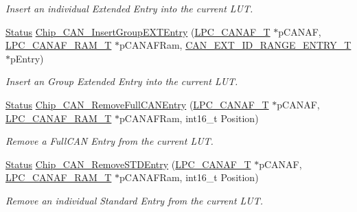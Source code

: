 \begin{DoxyCompactItemize}
\begin{DoxyCompactList}\small\item\em Insert an individual Extended Entry into the current L\-U\-T. \end{DoxyCompactList}\item 
\hyperlink{group__LPC__Types__Public__Types_ga67a0db04d321a74b7e7fcfd3f1a3f70b}{Status} \hyperlink{group__CAN__17XX__40XX_ga6bb7c9685df871a1d6dae14908c70397}{Chip\-\_\-\-C\-A\-N\-\_\-\-Insert\-Group\-E\-X\-T\-Entry} (\hyperlink{structLPC__CANAF__T}{L\-P\-C\-\_\-\-C\-A\-N\-A\-F\-\_\-\-T} $\ast$p\-C\-A\-N\-A\-F, \hyperlink{structLPC__CANAF__RAM__T}{L\-P\-C\-\_\-\-C\-A\-N\-A\-F\-\_\-\-R\-A\-M\-\_\-\-T} $\ast$p\-C\-A\-N\-A\-F\-Ram, \hyperlink{structCAN__EXT__ID__RANGE__ENTRY__T}{C\-A\-N\-\_\-\-E\-X\-T\-\_\-\-I\-D\-\_\-\-R\-A\-N\-G\-E\-\_\-\-E\-N\-T\-R\-Y\-\_\-\-T} $\ast$p\-Entry)
\begin{DoxyCompactList}\small\item\em Insert an Group Extended Entry into the current L\-U\-T. \end{DoxyCompactList}\item 
\hyperlink{group__LPC__Types__Public__Types_ga67a0db04d321a74b7e7fcfd3f1a3f70b}{Status} \hyperlink{group__CAN__17XX__40XX_ga8d00f1ed0727ec6812ce72d4a194519f}{Chip\-\_\-\-C\-A\-N\-\_\-\-Remove\-Full\-C\-A\-N\-Entry} (\hyperlink{structLPC__CANAF__T}{L\-P\-C\-\_\-\-C\-A\-N\-A\-F\-\_\-\-T} $\ast$p\-C\-A\-N\-A\-F, \hyperlink{structLPC__CANAF__RAM__T}{L\-P\-C\-\_\-\-C\-A\-N\-A\-F\-\_\-\-R\-A\-M\-\_\-\-T} $\ast$p\-C\-A\-N\-A\-F\-Ram, int16\-\_\-t Position)
\begin{DoxyCompactList}\small\item\em Remove a Full\-C\-A\-N Entry from the current L\-U\-T. \end{DoxyCompactList}\item 
\hyperlink{group__LPC__Types__Public__Types_ga67a0db04d321a74b7e7fcfd3f1a3f70b}{Status} \hyperlink{group__CAN__17XX__40XX_gac991bc7a590c7069e4149a0b8ccfcb55}{Chip\-\_\-\-C\-A\-N\-\_\-\-Remove\-S\-T\-D\-Entry} (\hyperlink{structLPC__CANAF__T}{L\-P\-C\-\_\-\-C\-A\-N\-A\-F\-\_\-\-T} $\ast$p\-C\-A\-N\-A\-F, \hyperlink{structLPC__CANAF__RAM__T}{L\-P\-C\-\_\-\-C\-A\-N\-A\-F\-\_\-\-R\-A\-M\-\_\-\-T} $\ast$p\-C\-A\-N\-A\-F\-Ram, int16\-\_\-t Position)
\begin{DoxyCompactList}\small\item\em Remove an individual Standard Entry from the current L\-U\-T. \end{DoxyCompactList}\item 

\end{DoxyCompactItemize}
